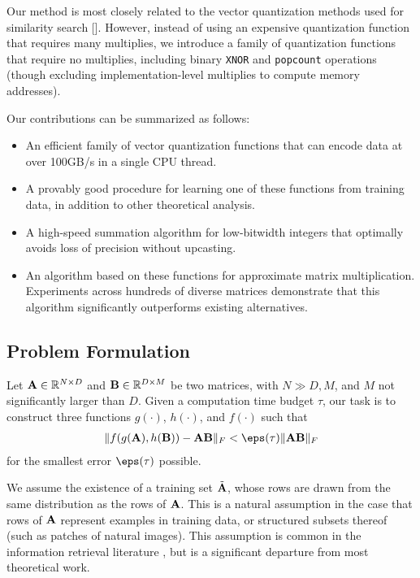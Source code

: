Our method is most closely related to the vector quantization methods used for similarity search []. However, instead of using an expensive quantization function that requires many multiplies, we introduce a family of quantization functions that require no multiplies, including binary \texttt{XNOR} and \texttt{popcount} operations (though excluding implementation-level multiplies to compute memory addresses).

Our contributions can be summarized as follows:
\begin{itemize}
    \item An efficient family of vector quantization functions that can encode data at over 100GB/s in a single CPU thread.
    \item A provably good procedure for learning one of these functions from training data, in addition to other theoretical analysis.
    \item A high-speed summation algorithm for low-bitwidth integers that optimally avoids loss of precision without upcasting.
    \item An algorithm based on these functions for approximate matrix multiplication. Experiments across hundreds of diverse matrices demonstrate that this algorithm significantly outperforms existing alternatives.
\end{itemize}

\subsection{Problem Formulation}

Let $\mathbf{A} \in \mathbb{R}^{N \times D}$ and $\mathbf{B} \in \mathbb{R}^{D \times M}$ be two matrices, with $N \gg D, M$, and $M$ not significantly larger than $D$. Given a computation time budget $\tau$, our task is to
construct three functions $g(\cdot)$, $h(\cdot)$, and $f(\cdot)$ such that
\begin{align}
    \norm{f(g(\A), h(\B)) - \A\B}_F < \eps(\tau) \norm{\A\B}_F
\end{align}
for the smallest error $\eps(\tau)$ possible.


We assume the existence of a training set $\tilde{\mathbf{A}}$, whose rows are drawn from the same distribution as the rows of $\mathbf{A}$. This is a natural assumption in the case that rows of $\mathbf{A}$ represent examples in training data, or structured subsets thereof (such as patches of natural images). This assumption is common in the information retrieval literature \cite{bolt, pairq}, but is a significant departure from most theoretical work.

